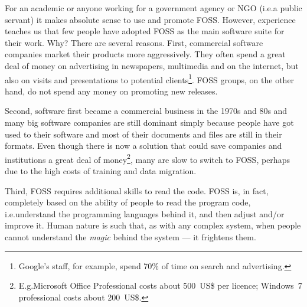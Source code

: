 \documentclass[graybox,envcountchap,sectrefs,UStrade]{svmono}
\begin{document}
For an academic or anyone working for a government agency or NGO (i.e.\@ a public servant) it makes absolute sense to use and promote FOSS. However, experience teaches us that few people have adopted FOSS as the main software suite for their work. Why? There are several reasons. First, commercial software companies market their products more aggressively. They often spend a great deal of money on advertising in newspapers, multimedia and on the internet, but also on visits and presentations to potential clients\footnote{Google's staff, for example, spend 70\% of time on search and advertising.}. FOSS groups, on the other hand, do not spend any money on promoting new releases.\par

Second, software first became a commercial business in the 1970s and 80s and many big software companies are still dominant simply because people have got used to their software and most of their documents and files are still in their formats. Even though there is now a solution that could save companies and institutions a great deal of money\footnote{E.g.\@ Microsoft Office Professional costs about 500~US\$ per licence; Windows~7 professional costs about 200~US\$.}, many are slow to switch to FOSS, perhaps due to the high costs of training and data migration.\par

Third, FOSS requires additional skills to read the code. FOSS is, in fact, completely based on the ability of people to read the program code, i.e.\@ understand the programming languages behind it, and then adjust and/or improve it. Human nature is such that, as with any complex system, when people cannot understand the \emph{magic} behind the system --- it frightens them. \par
\end{document}
